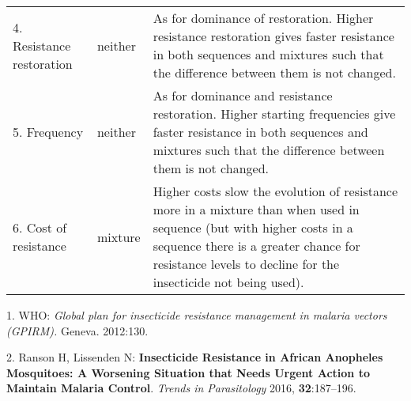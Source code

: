 \documentclass[11pt,]{article}
\begin{document}
\begin{longtable}[]{@{}lll@{}}
\begin{minipage}[t]{0.28\columnwidth}
4. Resistance restoration\strut
\end{minipage} & \begin{minipage}[t]{0.10\columnwidth}\raggedright\strut
neither\strut
\end{minipage} & \begin{minipage}[t]{0.53\columnwidth}\raggedright\strut
As for dominance of restoration. Higher resistance restoration gives
faster resistance in both sequences and mixtures such that the
difference between them is not changed.\strut
\end{minipage}\tabularnewline
\begin{minipage}[t]{0.28\columnwidth}\raggedright\strut
5. Frequency\strut
\end{minipage} & \begin{minipage}[t]{0.10\columnwidth}\raggedright\strut
neither\strut
\end{minipage} & \begin{minipage}[t]{0.53\columnwidth}\raggedright\strut
As for dominance and resistance restoration. Higher starting frequencies
give faster resistance in both sequences and mixtures such that the
difference between them is not changed.\strut
\end{minipage}\tabularnewline
\begin{minipage}[t]{0.28\columnwidth}\raggedright\strut
6. Cost of resistance\strut
\end{minipage} & \begin{minipage}[t]{0.10\columnwidth}\raggedright\strut
mixture\strut
\end{minipage} & \begin{minipage}[t]{0.53\columnwidth}\raggedright\strut
Higher costs slow the evolution of resistance more in a mixture than
when used in sequence (but with higher costs in a sequence there is a
greater chance for resistance levels to decline for the insecticide not
being used).\strut
\end{minipage}\tabularnewline
\bottomrule
\end{longtable}

\hypertarget{refs}{}
\hypertarget{ref-WHO2012}{}
1. WHO: \emph{Global plan for insecticide resistance management in
malaria vectors (GPIRM).} Geneva. 2012:130.

\hypertarget{ref-Ranson2016}{}
2. Ranson H, Lissenden N: \textbf{Insecticide Resistance in African
Anopheles Mosquitoes: A Worsening Situation that Needs Urgent Action to
Maintain Malaria Control}. \emph{Trends in Parasitology} 2016,
\textbf{32}:187--196.
\end{document}
